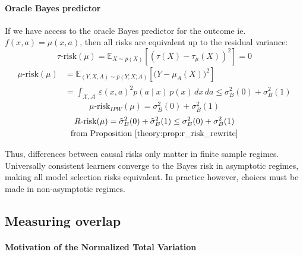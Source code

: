 \documentclass[a4paper,num-refs]{oup-contemporary}%
\begin{document}
\paragraph{Oracle Bayes predictor}\label{remark:bayes_oracle} If we
have access to the oracle Bayes predictor for the outcome ie.~$f(x,
    a)=\mu(x, a)$, then all risks are equivalent up to the residual variance:
\begin{equation}
    \tau\text{-risk}(\mu) = \mathbb E_{X\sim p(X)}[(\tau(X) - \tau_{\mu}(X))^2] = 0
\end{equation}
\begin{align}
    \mu\text{-risk}(\mu) & = \mathbb E_{(Y, X, A) \sim p(Y;X;A)}[\big( Y - \mu_A(X)\big)^2] \\
                         & = \int_{\mathcal X, \mathcal A}
    \,\varepsilon(x,a)^2 p(a \mid x) \,p(x) \,dx\,da  \leq \sigma_B^{2}(0) + \sigma_B^{2}(1) \nonumber
\end{align}
\begin{equation}
    \mu\text{-risk}_{IPW}(\mu) = \sigma_B^{2}(0) + \sigma_B^{2}(1)
\end{equation}
\begin{multline}
    R\text{-risk}(\mu) = \tilde{\sigma}_B^{2}(0) + \tilde{\sigma}_B^{2}(1)
    \leq \sigma_B^{2}(0) + \sigma_B^{2}(1)  \\  \text{from Proposition \ref{theory:prop:r_risk_rewrite}}%
\end{multline}

Thus, differences between causal risks only matter in finite sample regimes.
Universally consistent learners converge to the Bayes risk in asymptotic
regimes, making all model selection risks equivalent. In practice however,
choices must be made in non-asymptotic regimes.


\subsection{Measuring overlap}\label{apd:motivation_ntv}

\paragraph{Motivation of the Normalized Total Variation}

\end{document}
